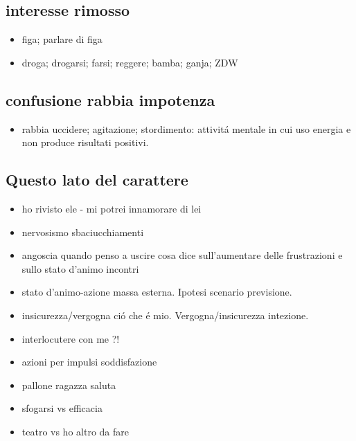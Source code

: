 \subsection{interesse rimosso}

\begin{itemize}

\item figa; parlare di figa

\item droga; drogarsi; farsi; reggere; bamba; ganja; ZDW

\end{itemize}

\subsection{confusione rabbia impotenza}

\begin{itemize}

\item rabbia uccidere; agitazione; stordimento: attivit\'a mentale in cui uso energia e 
non produce risultati positivi.



\end{itemize}

\subsection{Questo lato del carattere}

\begin{itemize}

\item ho rivisto ele - mi potrei innamorare di lei

\item nervosismo sbaciucchiamenti

\item angoscia quando penso a uscire cosa dice sull'aumentare delle frustrazioni e sullo stato d'animo incontri

\item stato d'animo-azione massa esterna. Ipotesi scenario previsione.

\item insicurezza/vergogna ci\'o che \'e mio. Vergogna/insicurezza intezione. 

\item interlocutere con me ?!

\item azioni per impulsi soddisfazione

\item pallone ragazza saluta

\item sfogarsi vs efficacia 

\item teatro vs ho altro da fare

\end{itemize}

